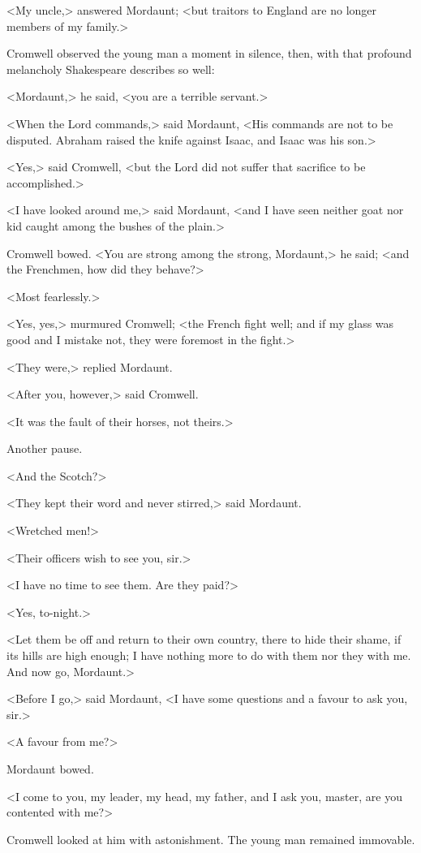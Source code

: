 <My uncle,> answered Mordaunt; <but traitors to England are no longer members of my family.>

Cromwell observed the young man a moment in silence, then, with that profound melancholy Shakespeare describes so well:

<Mordaunt,> he said, <you are a terrible servant.>

<When the Lord commands,> said Mordaunt, <His commands are not to be disputed. Abraham raised the knife against Isaac, and Isaac was his son.>

<Yes,> said Cromwell, <but the Lord did not suffer that sacrifice to be accomplished.>

<I have looked around me,> said Mordaunt, <and I have seen neither goat nor kid caught among the bushes of the plain.>

Cromwell bowed. <You are strong among the strong, Mordaunt,> he said; <and the Frenchmen, how did they behave?>

<Most fearlessly.>

<Yes, yes,> murmured Cromwell; <the French fight well; and if my glass was good and I mistake not, they were foremost in the fight.>

<They were,> replied Mordaunt.

<After you, however,> said Cromwell.

<It was the fault of their horses, not theirs.>

Another pause.

<And the Scotch?>

<They kept their word and never stirred,> said Mordaunt.

<Wretched men!>

<Their officers wish to see you, sir.>

<I have no time to see them. Are they paid?>

<Yes, to-night.>

<Let them be off and return to their own country, there to hide their shame, if its hills are high enough; I have nothing more to do with them nor they with me. And now go, Mordaunt.>

<Before I go,> said Mordaunt, <I have some questions and a favour to ask you, sir.>

<A favour from me?>

Mordaunt bowed.

<I come to you, my leader, my head, my father, and I ask you, master, are you contented with me?>

Cromwell looked at him with astonishment. The young man remained immovable.

